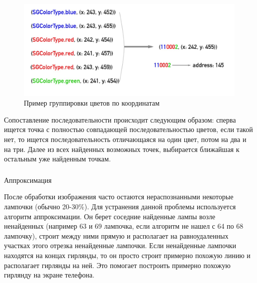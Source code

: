 ~
\begin{figure}[H]
\centering
	\includegraphics[scale=0.35]{figures/calibration_grouping.jpg}
	\caption{Пример группировки цветов по координатам}
	\label{fig:develop:algorithm:grouping}
\end{figure}

Сопоставление последовательности происходит следующим образом: сперва ищется точка с полностью совпадающей последовательностью цветов, если такой нет, то ищется последовательность отличающаяся на один цвет, потом на два и на три. Далее из всех найденных возможных точек, выбирается ближайшая к остальным уже найденным точкам.

\subsubsection{} Аппроксимация
\label{sec:develop:algorithm:approximation}

После обработки изображения часто остаются нераспознанными некоторые лампочки (обычно 20-30\%). Для устранения данной проблемы используется алгоритм аппроксимации. Он берет соседние найденные лампы возле ненайденных (например 63 и 69 лампочка, если алгоритм не нашел с 64 по 68 лампочку), строит между ними прямую и располагает на равноудаленных участках этого отрезка ненайденные лампочки. Если ненайденные лампочки находятся на концах гирлянды, то он просто строит примерно похожую линию и располагает гирлянды на ней. Это помогает построить примерно похожую гирлянду на экране телефона.

